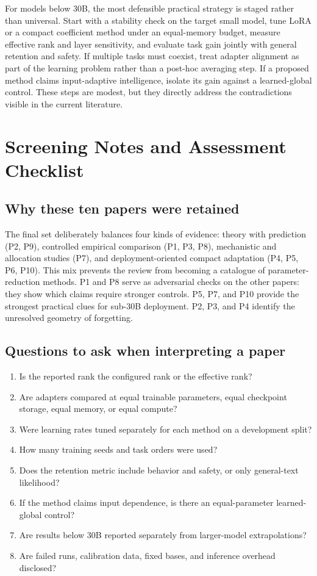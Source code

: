 \documentclass[11pt]{article}
\begin{document}
For models below 30B, the most defensible practical strategy is staged rather than universal. Start with a stability check on the target small model, tune LoRA or a compact coefficient method under an equal-memory budget, measure effective rank and layer sensitivity, and evaluate task gain jointly with general retention and safety. If multiple tasks must coexist, treat adapter alignment as part of the learning problem rather than a post-hoc averaging step. If a proposed method claims input-adaptive intelligence, isolate its gain against a learned-global control. These steps are modest, but they directly address the contradictions visible in the current literature.

\appendix
\section{Screening Notes and Assessment Checklist}

\subsection{Why these ten papers were retained}

The final set deliberately balances four kinds of evidence: theory with prediction (P2, P9), controlled empirical comparison (P1, P3, P8), mechanistic and allocation studies (P7), and deployment-oriented compact adaptation (P4, P5, P6, P10). This mix prevents the review from becoming a catalogue of parameter-reduction methods. P1 and P8 serve as adversarial checks on the other papers: they show which claims require stronger controls. P5, P7, and P10 provide the strongest practical clues for sub-30B deployment. P2, P3, and P4 identify the unresolved geometry of forgetting.

\subsection{Questions to ask when interpreting a paper}

\begin{enumerate}
  \item Is the reported rank the configured rank or the effective rank?
  \item Are adapters compared at equal trainable parameters, equal checkpoint storage, equal memory, or equal compute?
  \item Were learning rates tuned separately for each method on a development split?
  \item How many training seeds and task orders were used?
  \item Does the retention metric include behavior and safety, or only general-text likelihood?
  \item If the method claims input dependence, is there an equal-parameter learned-global control?
  \item Are results below 30B reported separately from larger-model extrapolations?
  \item Are failed runs, calibration data, fixed bases, and inference overhead disclosed?
\end{enumerate}
\end{document}
